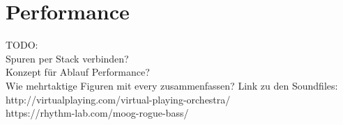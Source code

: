 \documentclass[
10pt, %
a4paper, %
oneside, %
headinclude,footinclude, %
BCOR5mm, %
]{scrartcl}
\begin{document}
\section{Performance}
TODO:\\
Spuren per Stack verbinden?\\
Konzept für Ablauf Performance?\\
Wie mehrtaktige Figuren mit every zusammenfassen?
Link zu den Soundfiles: http://virtualplaying.com/virtual-playing-orchestra/ \\
https://rhythm-lab.com/moog-rogue-bass/

\pagebreak


\renewcommand{\refname}{\spacedlowsmallcaps{Literatur/Quellen}} %




\end{document}
